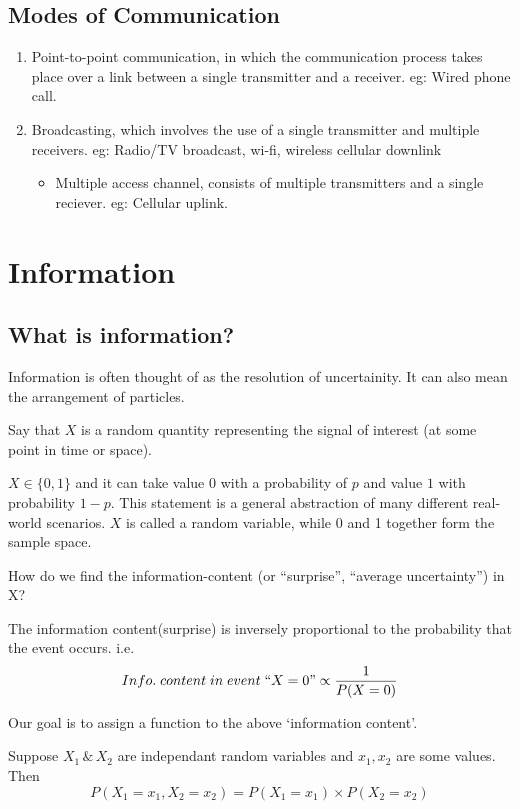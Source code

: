 \documentclass{article}
\begin{document}
\subsection{Modes of Communication}
\begin{enumerate}
    \item Point-to-point communication, in which the communication process takes place over a link between a single transmitter and a receiver. eg: Wired phone call.
    \item Broadcasting, which involves the use of a single  transmitter and multiple receivers. eg: Radio/TV broadcast, wi-fi, wireless cellular downlink
    \begin{itemize}
        \item Multiple access channel, consists of multiple transmitters and a single reciever. eg: Cellular uplink.
    \end{itemize}
\end{enumerate}

\section{Information}

\subsection{What is information?}
    Information is often thought of as the resolution of uncertainity. It can also mean the arrangement of particles.

    Say that $X$ is a random quantity representing the signal of interest (at some point in time or space).

$X \in \{0,1\}$ and it can take value $0$ with a probability of $p$ and value $1$ with probability $1-p$. This statement is a general abstraction of many different real-world scenarios.
$X$ is called a random variable, while 0 and 1 together form the sample space.

How do we find the information-content (or ``surprise'', ``average uncertainty'') in X?

The information content(surprise) is inversely proportional to the probability that the event occurs. i.e.
$$ Info.\; content\; in \;event \;``X=0" \propto \frac{1}{P(X=0)}$$

Our goal is to assign a function to the above `information content'.

Suppose $X_1\, \&\, X_2$ are independant random variables and $x_1, x_2$ are some values. Then
$$ P(X_1=x_1,X_2=x_2)=P(X_1=x_1)\times P(X_2=x_2)$$
\end{document}

